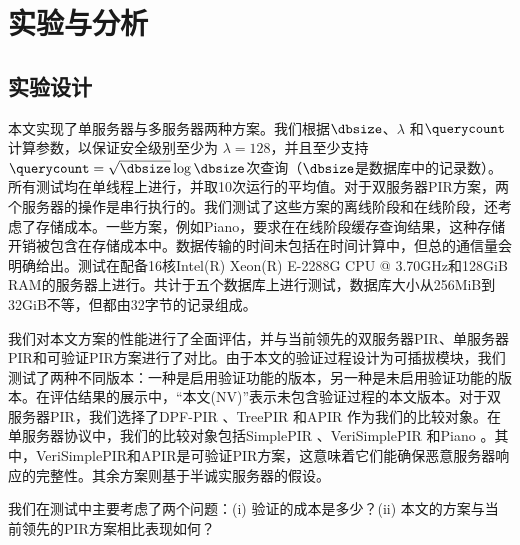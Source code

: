 \section{实验与分析}
\label{sec:evaluation}
\subsection{实验设计}
本文实现了单服务器与多服务器两种方案。我们根据$\dbsize$、$\lambda$ 和$\querycount$计算参数，以保证安全级别至少为 $\lambda=128$，并且至少支持$\querycount=\sqrt{\dbsize}\log{\dbsize}$次查询（$\dbsize$是数据库中的记录数）。所有测试均在单线程上进行，并取10次运行的平均值。对于双服务器PIR方案，两个服务器的操作是串行执行的。我们测试了这些方案的离线阶段和在线阶段，还考虑了存储成本。一些方案，例如Piano，要求在在线阶段缓存查询结果，这种存储开销被包含在存储成本中。数据传输的时间未包括在时间计算中，但总的通信量会明确给出。测试在配备16核Intel(R) Xeon(R) E-2288G CPU @ 3.70GHz和128GiB RAM的服务器上进行。共计于五个数据库上进行测试，数据库大小从256MiB到32GiB不等，但都由32字节的记录组成。

我们对本文方案的性能进行了全面评估，并与当前领先的双服务器PIR、单服务器PIR和可验证PIR方案进行了对比。由于本文的验证过程设计为可插拔模块，我们测试了两种不同版本：一种是启用验证功能的版本，另一种是未启用验证功能的版本。在评估结果的展示中，“本文(NV)”表示未包含验证过程的本文版本。对于双服务器PIR，我们选择了DPF-PIR \cite{EC:GilIsh14}、TreePIR \cite{C:LazPap23}和APIR \cite{APIR23}作为我们的比较对象。在单服务器协议中，我们的比较对象包括SimplePIR \cite{SimplePIR}、VeriSimplePIR \cite{VeriSimplePIR}和Piano \cite{Piano}。其中，VeriSimplePIR和APIR是可验证PIR方案，这意味着它们能确保恶意服务器响应的完整性。其余方案则基于半诚实服务器的假设。

我们在测试中主要考虑了两个问题：(i) 验证的成本是多少？(ii) 本文的方案与当前领先的PIR方案相比表现如何？

